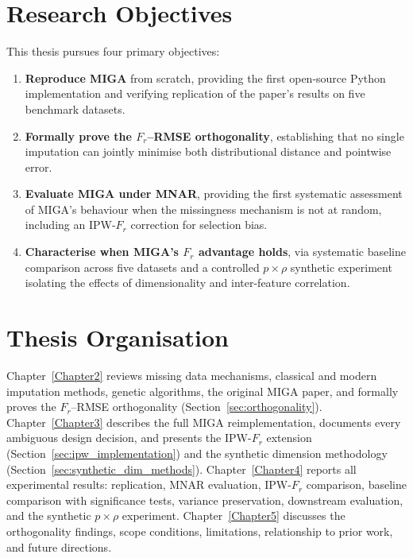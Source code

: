 \section{Research Objectives}

This thesis pursues four primary objectives:

\begin{enumerate}
    \item \textbf{Reproduce MIGA} from scratch, providing the first open-source Python implementation and verifying replication of the paper's results on five benchmark datasets.
    \item \textbf{Formally prove the $F_r$--RMSE orthogonality}, establishing that no single imputation can jointly minimise both distributional distance and pointwise error.
    \item \textbf{Evaluate MIGA under MNAR}, providing the first systematic assessment of MIGA's behaviour when the missingness mechanism is not at random, including an IPW-$F_r$ correction for selection bias.
    \item \textbf{Characterise when MIGA's $F_r$ advantage holds}, via systematic baseline comparison across five datasets and a controlled $p \times \rho$ synthetic experiment isolating the effects of dimensionality and inter-feature correlation.
\end{enumerate}

\section{Thesis Organisation}

Chapter~\ref{Chapter2} reviews missing data mechanisms, classical and modern imputation methods, genetic algorithms, the original MIGA paper, and formally proves the $F_r$--RMSE orthogonality (Section~\ref{sec:orthogonality}). Chapter~\ref{Chapter3} describes the full MIGA reimplementation, documents every ambiguous design decision, and presents the IPW-$F_r$ extension (Section~\ref{sec:ipw_implementation}) and the synthetic dimension methodology (Section~\ref{sec:synthetic_dim_methods}). Chapter~\ref{Chapter4} reports all experimental results: replication, MNAR evaluation, IPW-$F_r$ comparison, baseline comparison with significance tests, variance preservation, downstream evaluation, and the synthetic $p \times \rho$ experiment. Chapter~\ref{Chapter5} discusses the orthogonality findings, scope conditions, limitations, relationship to prior work, and future directions.

